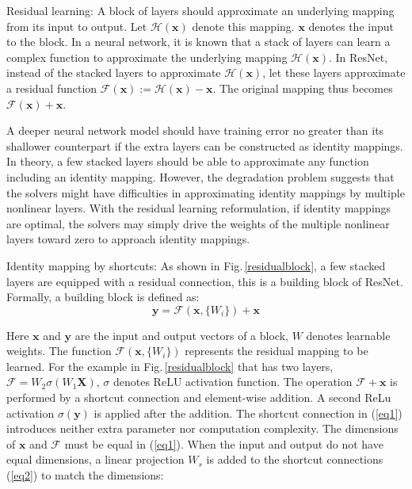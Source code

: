 Residual learning:
A block of layers should approximate an underlying mapping from its input to output. Let $\mathcal{H}(\mathbf{x})$ denote this mapping. $\mathbf{x}$ denotes the input to the block. In a neural network, it is known that a stack of layers can learn a complex function to approximate the underlying mapping $\mathcal{H}(\mathbf{x})$. In ResNet, instead of the stacked layers to approximate $\mathcal{H}(\mathbf{x})$, let these layers approximate a residual function $\mathcal{F}(\mathbf{x}) := \mathcal{H}(\mathbf{x})-\mathbf{x}$. The original mapping thus becomes $\mathcal{F}(\mathbf{x})+\mathbf{x}$. 

A deeper neural network model should have training error no greater than its shallower counterpart if the extra layers can be constructed as identity mappings. In theory, a few stacked layers should be able to approximate any function including an identity mapping. However, the degradation problem suggests that the solvers might have difficulties in approximating identity mappings by multiple nonlinear layers. With the residual learning reformulation, if identity mappings are optimal, the solvers may simply drive the weights of the multiple nonlinear layers toward zero to approach identity mappings. 

Identity mapping by shortcuts: 
As shown in Fig.\,\ref{residualblock}, a few stacked layers are equipped with a residual connection, this is a building block of ResNet. Formally, a building block is defined as: 
\begin{equation} \label{eq1}
\mathbf{y} = \mathcal{F} (\mathbf{x}, \{W_i\}) + \mathbf{x}
\end{equation}

Here $\mathbf{x}$ and $\mathbf{y}$ are the input and output vectors of a block, $W$ denotes learnable weights. The function $\mathcal{F} (\mathbf{x}, \{W_i\})$ represents the residual mapping to be learned. For the example in Fig.\,\ref{residualblock} that has two layers, $\mathcal{F}=W_2\sigma(W_1\mathbf{X})$, $\sigma$ denotes ReLU activation function. The operation $\mathcal{F} + \mathbf{x}$ is performed by a shortcut connection and element-wise addition. A second ReLu activation $\sigma(\mathbf{y})$ is applied after the addition. The shortcut connection in (\ref{eq1}) introduces neither extra parameter nor computation complexity. The dimensions of $\mathbf{x}$ and $\mathcal{F}$ must be equal in (\ref{eq1}). When the input and output do not have equal dimensions, a linear projection $W_s$ is added to the shortcut connections (\ref{eq2}) to match the dimensions: 

